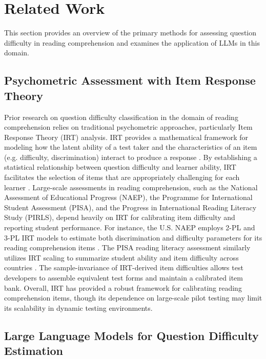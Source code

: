 \section{Related Work}
This section provides an overview of the primary methods for assessing question difficulty in reading comprehension and examines the application of LLMs in this domain. 

\subsection{Psychometric Assessment with Item Response Theory}

Prior research on question difficulty classification in the domain of reading comprehension relies on traditional psychometric approaches, particularly Item Response Theory (IRT) analysis. IRT provides a mathematical framework for modeling how the latent ability of a test taker and the characteristics of an item (e.g. difficulty, discrimination) interact to produce a response \cite{lord2012applications}. By establishing a statistical relationship between question difficulty and learner ability, IRT facilitates the selection of items that are appropriately challenging for each learner \cite{uto2023difficulty}. Large-scale assessments in reading comprehension, such as the National Assessment of Educational Progress (NAEP), the Programme for International Student Assessment (PISA), and the Progress in International Reading Literacy Study (PIRLS), depend heavily on IRT for calibrating item difficulty and reporting student performance. For instance, the U.S. NAEP employs 2-PL and 3-PL IRT models to estimate both discrimination and difficulty parameters for its reading comprehension items \cite{van2016assessment}. The PISA reading literacy assessment similarly utilizes IRT scaling to summarize student ability and item difficulty across countries \cite{xu2025towards}. The sample-invariance of IRT-derived item difficulties allows test developers to assemble equivalent test forms and maintain a calibrated item bank. Overall, IRT has provided a robust framework for calibrating reading comprehension items, though its dependence on large-scale pilot testing may limit its scalability in dynamic testing environments.

\subsection{Large Language Models for Question Difficulty Estimation}

